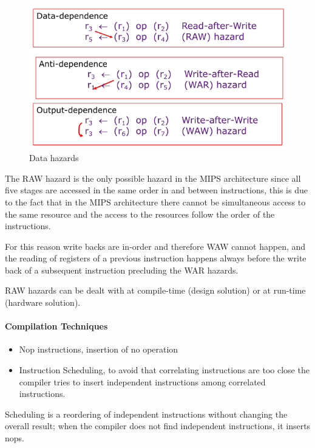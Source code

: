 \begin{figure}
    \centering
    \includegraphics[scale = 0.5]{images/data-hazards-1}
    \caption{Data hazards}
    \label{fig:data-hazards}
\end{figure}


The RAW hazard is the only possible hazard in the MIPS architecture since all five stages are accessed in the
same order in and between instructions, this is due to the fact that in the MIPS architecture there cannot
be simultaneous access to the same resource and the access to the resources follow the order of the instructions.

For this reason write backs are in-order and therefore WAW cannot happen, and the reading of registers of a previous
instruction happens always before the write back of a subsequent instruction precluding the WAR hazards.

RAW hazards can be dealt with at compile-time (design solution) or at run-time (hardware solution).

\paragraph{Compilation Techniques}
\begin{itemize}
    \item[\textrightarrow] Nop instructions, insertion of no operation
    \item[\textrightarrow] Instruction Scheduling, to avoid that correlating instructions are too close the compiler
    tries to insert independent instructions among correlated instructions.
\end{itemize}
Scheduling is a reordering of independent instructions without changing the overall result;
when the compiler does not find independent instructions, it inserts nops.

